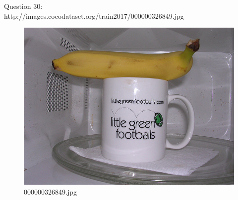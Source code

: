     Question 30:\\http://images.cocodataset.org/train2017/000000326849.jpg
    \begin{figure}[h]
        \centering
        \includegraphics[width=0.8\linewidth]{../image set/easy/000000326849.jpg}
        \caption{000000326849.jpg}
    \end{figure}
